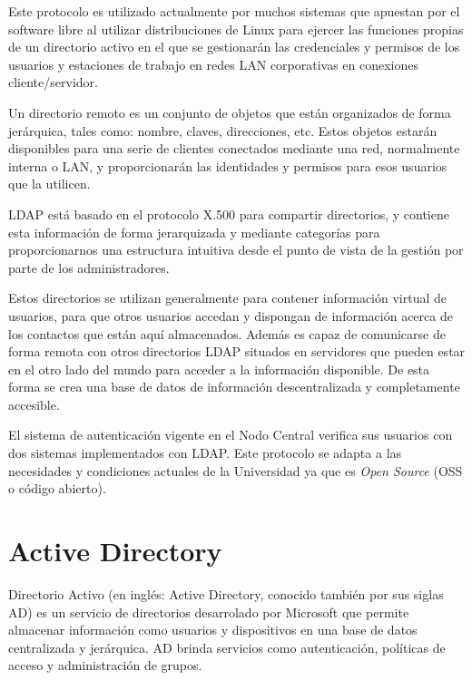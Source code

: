 Este protocolo es utilizado actualmente por muchos sistemas que apuestan por el software libre al utilizar distribuciones de Linux para ejercer las funciones propias de un directorio activo en el que se gestionarán las credenciales y permisos de los usuarios y estaciones de trabajo en redes LAN corporativas en conexiones cliente/servidor.

Un directorio remoto es un conjunto de objetos que están organizados de forma jerárquica, tales como: nombre, claves, direcciones, etc. Estos objetos estarán disponibles para una serie de clientes conectados mediante una red, normalmente interna o LAN, y proporcionarán las identidades y permisos para esos usuarios que la utilicen.

LDAP está basado en el protocolo X.500 para compartir directorios, y contiene esta información de forma jerarquizada y mediante categorías para proporcionarnos una estructura intuitiva desde el punto de vista de la gestión por parte de los administradores.

Estos directorios se utilizan generalmente para contener información virtual de usuarios, para que otros usuarios accedan y dispongan de información acerca de los contactos que están aquí almacenados. Además es capaz de comunicarse de forma remota con otros directorios LDAP situados en servidores que pueden estar en el otro lado del mundo para acceder a la información disponible. De esta forma se crea una base de datos de información descentralizada y completamente accesible.
 
El sistema de autenticación vigente en el Nodo Central verifica sus usuarios con dos sistemas implementados con LDAP. Este protocolo se adapta a las necesidades y condiciones actuales de la Universidad ya que es \textit{Open Source} (OSS o código abierto).


\section{Active Directory}
Directorio Activo (en inglés: Active Directory, conocido también por sus siglas AD) es un servicio de directorios desarrolado por Microsoft que permite almacenar información como usuarios y dispositivos en una base de datos centralizada y jerárquica. AD brinda servicios como autenticación, políticas de acceso y administración de grupos.


